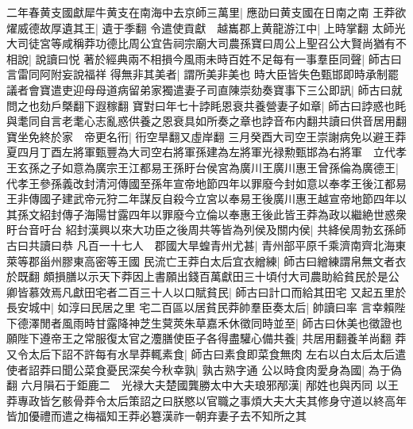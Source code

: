二年春黄支國獻犀牛黄支在南海中去京師三萬里|{
	應劭曰黄支國在日南之南}
王莽欲燿威德故厚遺其王|{
	遺于季翻}
令遣使貢獻　越巂郡上黄龍游江中|{
	上時掌翻}
太師光大司徒宮等咸稱莽功德比周公宜告祠宗廟大司農孫寶曰周公上聖召公大賢尚猶有不相說|{
	說讀曰悦}
著於經典兩不相損今風雨未時百姓不足每有一事羣臣同聲|{
	師古曰言雷同阿附妄說福祥}
得無非其美者|{
	謂所美非美也}
時大臣皆失色甄邯即時承制罷議者會寶遣吏迎母母道病留弟家獨遣妻子司直陳崇劾奏寶事下三公即訊|{
	師古曰就問之也劾戶槩翻下遐稼翻}
寶對曰年七十誖眊恩衰共養營妻子如章|{
	師古曰誖惑也眊與耄同自言老耄心志亂惑供養之恩衰具如所奏之章也誖音布内翻共讀曰供音居用翻}
寶坐免終於家　帝更名衎|{
	衎空旱翻又虛岸翻}
三月癸酉大司空王崇謝病免以避王莽　夏四月丁酉左將軍甄豐為大司空右將軍孫建為左將軍光禄勲甄邯為右將軍　立代孝王玄孫之子如意為廣宗王江都易王孫盱台侯宮為廣川王廣川惠王曾孫倫為廣德王|{
	代孝王參孫義改封清河傳國至孫年宣帝地節四年以罪廢今封如意以奉孝王後江都易王非傳國子建武帝元狩二年謀反自殺今立宮以奉易王後廣川惠王越宣帝地節四年以其孫文紹封傳子海陽甘露四年以罪廢今立倫以奉惠王後此皆王莽為政以繼絶世惑衆盱台音吁台}
紹封漢興以來大功臣之後周共等皆為列侯及關内侯|{
	共絳侯周勃玄孫師古曰共讀曰恭}
凡百一十七人　郡國大旱蝗青州尤甚|{
	青州部平原千乘濟南齊北海東萊等郡甾州膠東高密等王國}
民流亡王莽白太后宜衣繒練|{
	師古曰繒練謂帛無文者衣於既翻}
頗損膳以示天下莽因上書願出錢百萬獻田三十頃付大司農助給貧民於是公卿皆慕效焉凡獻田宅者二百三十人以口賦貧民|{
	師古曰計口而給其田宅}
又起五里於長安城中|{
	如淳曰民居之里}
宅二百區以居貧民莽帥羣臣奏太后|{
	帥讀曰率}
言幸賴陛下德澤閒者風雨時甘露降神芝生蓂莢朱草嘉禾休徵同時並至|{
	師古曰休美也徵證也}
願陛下遵帝王之常服復太官之灋膳使臣子各得盡驩心備共養|{
	共居用翻養羊尚翻}
莽又令太后下詔不許每有水旱莽輒素食|{
	師古曰素食即菜食無肉}
左右以白太后太后遣使者詔莽曰聞公菜食憂民深矣今秋幸孰|{
	孰古熟字通}
公以時食肉愛身為國|{
	為于偽翻}
六月隕石于鉅鹿二　光禄大夫楚國龔勝太中大夫琅邪邴漢|{
	邴姓也與丙同}
以王莽專政皆乞骸骨莽令太后策詔之曰朕愍以官職之事煩大夫大夫其修身守道以終高年皆加優禮而遣之梅福知王莽必簒漢祚一朝弃妻子去不知所之其

